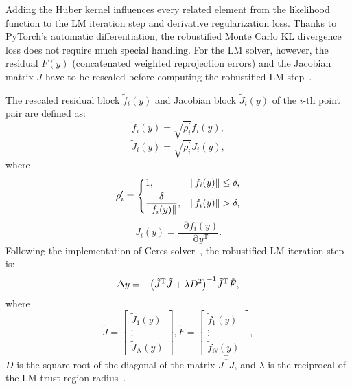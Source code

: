 \documentclass[10pt,twocolumn,letterpaper]{article}
\let\originalleft\left
\let\originalright\right
\renewcommand{\left}{\mathopen{}\mathclose\bgroup\originalleft}
\renewcommand{\right}{\aftergroup\egroup\originalright}
\let\originalpartial\partial
\renewcommand{\partial}{\mathop{}\!\mathrm{\originalpartial}}
\begin{document}
Adding the Huber kernel influences every related element from the likelihood function to the LM iteration step and derivative regularization loss. Thanks to PyTorch's automatic differentiation, the robustified Monte Carlo KL divergence loss does not require much special handling. For the LM solver, however, the residual $F(y)$ (concatenated weighted reprojection errors) and the Jacobian matrix $J$ have to be rescaled before computing the robustified LM step~\cite{triggsba}.

The rescaled residual block $\tilde{f}_i(y)$ and Jacobian block $\tilde{J}_i(y)$ of the $i$-th point pair are defined as:
\begin{equation}
    \tilde{f}_i(y) = \sqrt{\rho^\prime_i} f_i(y),
\end{equation}
\begin{equation}
    \tilde{J}_i(y) = \sqrt{\rho^\prime_i} J_i(y),
\end{equation}
where
\begin{equation}
 \rho^\prime_i = 
 \begin{dcases}
 1, & \| f_i(y) \| \leq \delta,\\
 \frac{\delta}{\| f_i(y) \|}, & \| f_i(y) \| > \delta,
 \end{dcases}
\label{eqn:huber2}
\end{equation}
\begin{equation}
    J_i(y) = \frac{\partial{f_i(y)}}{\partial{y^\text{T}}}.
\end{equation}
Following the implementation of Ceres solver~\cite{ceres-solver}, the robustified LM iteration step is:
\begin{equation}
    \Delta y = -\left(\tilde{J}^\text{T}\tilde{J} + \lambda D^2 \right)^{-1} \tilde{J}^\text{T} \tilde{F},
    \label{eqn:robustlmstep}
\end{equation}
where
\begin{equation}
    \tilde{J} = 
    \begin{bmatrix}
        \tilde{J}_1(y) \\
        \vdots\\
        \tilde{J}_N(y)
    \end{bmatrix},
        \tilde{F} = 
    \begin{bmatrix}
        \tilde{f}_1(y) \\
        \vdots\\
        \tilde{f}_N(y)
    \end{bmatrix},
\end{equation}
$D$ is the square root of the diagonal of the matrix $\tilde{J}^\text{T}\tilde{J}$, and $\lambda$ is the reciprocal of the LM trust region radius~\cite{ceres-solver}.
\end{document}
